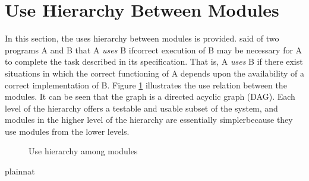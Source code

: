 \documentclass[12pt, titlepage]{article}
\begin{document}
\section{Use Hierarchy Between Modules} \label{SecUse}

In this section, the uses hierarchy between modules is
provided. \citet{Parnas1978} said of two programs A and B that A {\em uses} B
ifcorrect execution of B may be necessary for A to complete the task described
in
its specification. That is, A {\em uses} B if there exist situations in which
the correct functioning of A depends upon the availability of a correct
implementation of B.  Figure \ref{FigUH} illustrates the use relation between
the modules. It can be seen that the graph is a directed acyclic graph
(DAG). Each level of the hierarchy offers a testable and usable subset of the
system, and modules in the higher level of the hierarchy are essentially
simplerbecause they use modules from the lower levels.

\begin{figure}[H]
\centering
\caption{Use hierarchy among modules}
\label{FigUH}
\end{figure}


 {plainnat}

\end{document}
